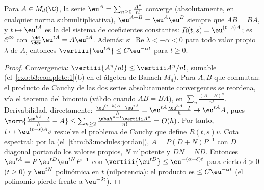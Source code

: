 \begin{theorem}\label{thm:b3:ode:matrixexp}
Para $A \in M_d(\C)$, la serie $\eu^{A} =
\sum_{n\geq0}\frac{A^n}{n!}$ converge (absolutamente, en cualquier norma
submultiplicativa), $\eu^{A+B} = \eu^A\eu^B$ siempre que $AB = BA$, y
$t \mapsto \eu^{tA}$ es la
 del sistema de
coeficientes constantes: $R(t,s) = \eu^{(t-s)A}$; es $\mathcal
C^\infty$ con $\frac{\dd}{\dd t}\eu^{tA} = A\eu^{tA}$. Además: si
$\operatorname{Re}\lambda < -\alpha < 0$ para todo valor propio
$\lambda$ de $A$, entonces $\vertiii{\eu^{tA}}
\leq C\eu^{-\alpha t}$ para $t \geq 0$.
\end{theorem}

\begin{proof}
Convergencia: $\vertiii{A^n/n!} \leq \vertiii A^n/n!$, sumable
(el~\cref{exo:b3:complete:1}(b) en el álgebra de Banach $M_d$). Para
$A, B$ que conmutan: el producto de Cauchy de las dos series
absolutamente convergentes se reordena, vía el teorema del binomio
(válido cuando $AB = BA$), en $\sum_n\frac{(A+B)^n}{n!}$. Derivabilidad,
directamente:
$\frac{\eu^{(t+h)A} - \eu^{tA}}h = \eu^{tA}\frac{\eu^{hA} -
I}{h} \to \eu^{tA}A$, pues $\norm{\frac{\eu^{hA} - I}h - A}
\leq \sum_{n\geq2}\frac{\abs h^{n-1}\vertiii A^n}{n!} =
O(h)$. Por tanto, $t \mapsto \eu^{(t - s)A}v$ resuelve el problema de
Cauchy que define $R(t,s)v$. Cota espectral: por la
(el~\cref{thm:b3:modules:jordan}), $A = P(D + N)P^{-1}$ con $D$ diagonal
portando los valores propios, $N$ nilpotente y $DN =
ND$. Entonces $\eu^{tA} = P\,\eu^{tD}\eu^{tN}P^{-1}$ con
$\vertiii{\eu^{tD}} \leq \eu^{-(\alpha + \delta)t}$ para cierto
$\delta > 0$ ($t \geq 0$) y $\eu^{tN}$ polinómica en $t$ (nilpotencia):
el producto es $\leq C\eu^{-\alpha t}$ (el polinomio pierde frente a
$\eu^{-\delta t}$).
\end{proof}

